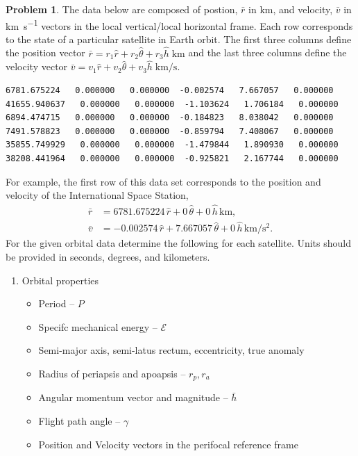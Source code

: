 \documentclass[10pt]{article}
\theoremstyle{definition}
\newtheorem{prob}{Problem}[section]
\newenvironment{subprob}%
{\renewcommand{\theenumi}{\alph{enumi}}\renewcommand{\labelenumi}{(\theenumi)}\begin{enumerate}}%
{\end{enumerate}}%
\begin{document}
\clearpage\newpage
\begin{prob}
    The data below are composed of postion, \( \bar r \) in \si{\kilo\meter}, and velocity, \( \bar v \) in \si{\kilo\meter\per\second} vectors in the local vertical/local horizontal frame. 
    Each row corresponds to the state of a particular satellite in Earth orbit. 
    The first three columns define the position vector \( \bar r = r_1 \hat r + r_2 \hat \theta + r_3 \hat h \; \si{\kilo\meter} \) and the last three columns define the velocity vector \( \bar v = v_1 \hat r + v_2 \hat \theta + v_3 \hat h \; \si{\kilo\meter\per\second} \).

    \begin{verbatim}
6781.675224   0.000000   0.000000  -0.002574   7.667057   0.000000
41655.940637   0.000000   0.000000  -1.103624   1.706184   0.000000
6894.474715   0.000000   0.000000  -0.184823   8.038042   0.000000
7491.578823   0.000000   0.000000  -0.859794   7.408067   0.000000
35855.749929   0.000000   0.000000  -1.479844   1.890930   0.000000
38208.441964   0.000000   0.000000  -0.925821   2.167744   0.000000
    \end{verbatim}
For example, the first row of this data set corresponds to the position and velocity of the International Space Station,
\begin{align*}
    \bar r &= 6781.675224 \, \hat r + 0 \, \hat \theta + 0 \, \hat h \, \si{\kilo\meter}, \\
    \bar v &= -0.002574 \, \hat r + 7.667057 \, \hat \theta + 0 \, \hat h \, \si{\kilo\meter\per\second\squared}.
\end{align*}
    For the given orbital data determine the following for each satellite.
    Units should be provided in seconds, degrees, and kilometers.

    \begin{subprob}
    \item Orbital properties
    \begin{itemize}
        \item Period -- \( P \) 
        \item Specifc mechanical energy -- \( \mathcal{E} \) 
        \item Semi-major axis, semi-latus rectum, eccentricity, true anomaly
        \item Radius of periapsis and apoapsis -- \( r_p, r_a \)
        \item Angular momentum vector and magnitude -- \( \bar h \)
        \item Flight path angle -- \( \gamma \)
        \item Position and Velocity vectors in the perifocal reference frame
    \end{itemize}


\end{subprob}
\end{prob}
\end{document}
